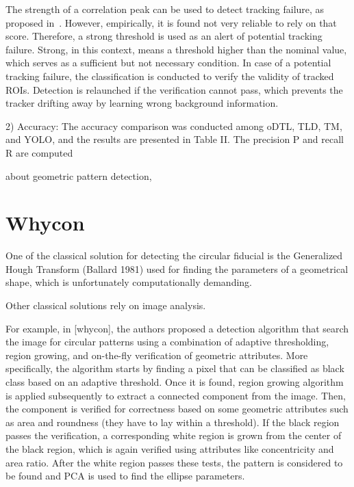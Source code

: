 \documentclass[a4paper]{report}
\begin{document}
The strength of a correlation peak can be used to detect tracking failure, as proposed in~\cite{MOSSE}. However, empirically, it is found not very reliable to rely on that score. Therefore, a strong threshold is used as an alert of potential tracking failure. Strong, in this context, means a threshold higher than the nominal value, which serves as a sufficient but not necessary condition. In case of a potential tracking failure, the classification is conducted to verify the validity of tracked ROIs. Detection is relaunched if the verification cannot pass, which prevents the tracker drifting away by learning wrong background information.



2) Accuracy: The accuracy comparison was conducted
among oDTL, TLD, TM, and YOLO, and the results are presented
in Table II. The precision P and recall R are computed


about geometric pattern detection,

\section{Whycon}
One of the classical solution for detecting the circular fiducial is the Generalized Hough Transform (Ballard 1981) used for finding the parameters of a geometrical shape, which is unfortunately computationally demanding. 

Other classical solutions rely on image analysis.

For example, in [whycon], the authors proposed a detection algorithm that search the image for circular patterns using a combination of adaptive thresholding, region growing, and on-the-fly verification of geometric attributes. More specifically, the algorithm starts by finding a pixel that can be classified as black class based on an adaptive threshold. Once it is found, region growing algorithm is applied subsequently to extract a connected component from the image. Then, the component is verified for correctness based on some geometric attributes such as area and roundness (they have to lay within a threshold). If the black region passes the verification, a corresponding white region is grown from the center of the black region, which is again verified using attributes like concentricity and area ratio. After the white region passes these tests, the pattern is considered to be found and PCA is used to find the ellipse parameters.
\end{document}
